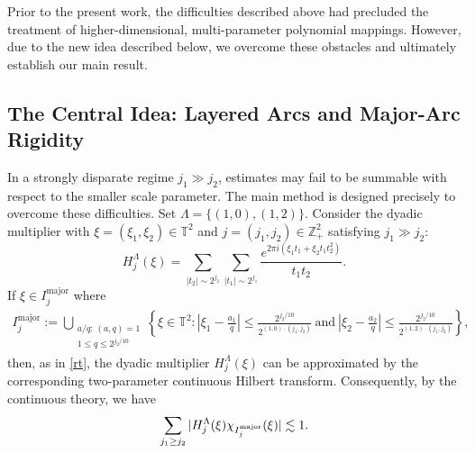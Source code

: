 \documentclass[11 pt,letterpaper]{amsart}
\theoremstyle{plain}
\theoremstyle{definition}
\theoremstyle{remark} \theoremstyle{exam} \theoremstyle{ob}
\numberwithin{equation}{section}
\begin{document}
Prior to the present work, the difficulties described above had precluded the treatment of higher-dimensional, multi-parameter polynomial mappings.
 However, due to  the new idea described below, we overcome these obstacles and ultimately establish our main result.


\subsection{The Central Idea: Layered Arcs and Major-Arc Rigidity} 
In a strongly
disparate regime $j_1\gg j_2$, estimates may fail to be summable with
respect to the smaller scale parameter.     The main method is designed precisely to overcome these difficulties.   Set $\Lambda=\{(1,0),(1,2)\}.$ Consider the dyadic multiplier with $\xi=(\xi_1,\xi_2)\in\mathbb{T}^{2}$ and $j=(j_1,j_2)\in \mathbb{Z}_{+}^{2}$ satisfying $j_1\gg j_2$:  $$H^{\Lambda}_{j}(\xi)=\sum_{|t_2|\sim 2^{j_2}}\sum_{|t_1|\sim 2^{j_1}} \frac{e^{2\pi i(\xi_1t_1+ \xi_2 t_1t_2^{2})}}{t_1t_2}.$$  
If $\xi\in I_j^{\mathrm{major}}$ where
\begin{align*}
	I_j^{\mathrm{major}}
	:=
	\bigcup_{\substack{a/q:\,(a,q)=1\\1\leq q\leq 2^{j_2/10}}}
	\left\{
	\xi\in\mathbb{T}^2:
	\left|\xi_1-\frac{a_1}{q}\right|
	\leq
	\frac{2^{j_2/10}}{2^{(1,0)\cdot(j_1,j_2)}} \ \text{and} \ \left|\xi_2-\frac{a_2}{q}\right|
	\leq
	\frac{2^{j_2/10}}{2^{(1,2)\cdot(j_1,j_2)}}
	\right\},
\end{align*}
then, as in \eqref{rt}, the dyadic multiplier $H^{\Lambda}_{j}(\xi)$  can be approximated by the corresponding two-parameter continuous Hilbert transform. Consequently,  by the continuous theory, we have  $$ \sum_{j_1\ge j_2} |H^{\Lambda}_{j}(\xi)\chi_{I_{j}^{\rm{major}}}(\xi) |\lesssim 1.$$\\
\end{document}
